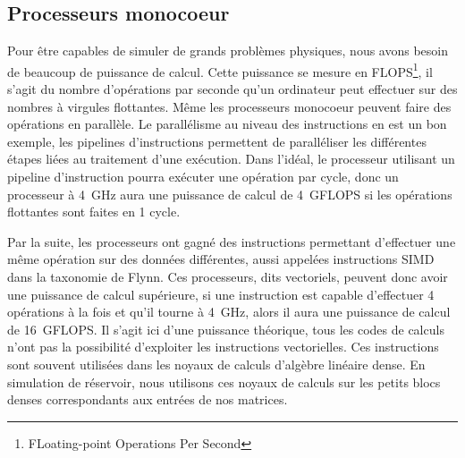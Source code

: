 \subsection{Processeurs monocoeur}
Pour être capables de simuler de grands problèmes physiques, nous avons besoin de beaucoup de puissance de calcul.
%
Cette puissance se mesure en FLOPS\footnote{FLoating-point Operations Per Second}, il s'agit du nombre d'opérations par seconde qu'un ordinateur peut effectuer sur des nombres à virgules flottantes.
%
Même les processeurs monocoeur peuvent faire des opérations en parallèle.
%
Le parallélisme au niveau des instructions en est un bon exemple, les pipelines d'instructions permettent de paralléliser les différentes étapes liées au traitement d'une exécution.
%
Dans l'idéal, le processeur utilisant un pipeline d'instruction pourra exécuter une opération par cycle, donc un processeur à 4~GHz aura une puissance de calcul de 4~GFLOPS si les opérations flottantes sont faites en 1 cycle.

Par la suite, les processeurs ont gagné des instructions permettant d'effectuer une même opération sur des données différentes, aussi appelées instructions SIMD dans la taxonomie de Flynn.
%
Ces processeurs, dits vectoriels, peuvent donc avoir une puissance de calcul supérieure, si une instruction est capable d'effectuer 4 opérations à la fois et qu'il tourne à 4~GHz, alors il aura une puissance de calcul de 16~GFLOPS.
%
Il s'agit ici d'une puissance théorique, tous les codes de calculs n'ont pas la possibilité d'exploiter les instructions vectorielles.
%
Ces instructions sont souvent utilisées dans les noyaux de calculs d'algèbre linéaire dense.
%
En simulation de réservoir, nous utilisons ces noyaux de calculs sur les petits blocs denses correspondants aux entrées de nos matrices.
